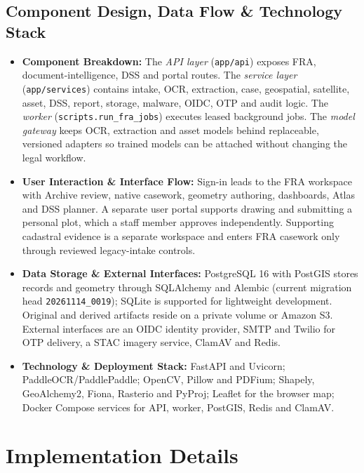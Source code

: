 \documentclass[11pt, a4paper]{article}
\begin{document}
\subsection{Component Design, Data Flow \& Technology Stack}
\begin{itemize}[noitemsep, topsep=2pt]
    \item \textbf{Component Breakdown:} The \textit{API layer} (\texttt{app/api}) exposes FRA, document-intelligence, DSS and portal routes. The \textit{service layer} (\texttt{app/services}) contains intake, OCR, extraction, case, geospatial, satellite, asset, DSS, report, storage, malware, OIDC, OTP and audit logic. The \textit{worker} (\texttt{scripts.run\_fra\_jobs}) executes leased background jobs. The \textit{model gateway} keeps OCR, extraction and asset models behind replaceable, versioned adapters so trained models can be attached without changing the legal workflow.
    \item \textbf{User Interaction \& Interface Flow:} Sign-in leads to the FRA workspace with Archive review, native casework, geometry authoring, dashboards, Atlas and DSS planner. A separate user portal supports drawing and submitting a personal plot, which a staff member approves independently. Supporting cadastral evidence is a separate workspace and enters FRA casework only through reviewed legacy-intake controls.
    \item \textbf{Data Storage \& External Interfaces:} PostgreSQL 16 with PostGIS stores records and geometry through SQLAlchemy and Alembic (current migration head \texttt{20261114\_0019}); SQLite is supported for lightweight development. Original and derived artifacts reside on a private volume or Amazon S3. External interfaces are an OIDC identity provider, SMTP and Twilio for OTP delivery, a STAC imagery service, ClamAV and Redis.
    \item \textbf{Technology \& Deployment Stack:} FastAPI and Uvicorn; PaddleOCR/PaddlePaddle; OpenCV, Pillow and PDFium; Shapely, GeoAlchemy2, Fiona, Rasterio and PyProj; Leaflet for the browser map; Docker Compose services for API, worker, PostGIS, Redis and ClamAV.
\end{itemize}

\section{Implementation Details}
\end{document}
